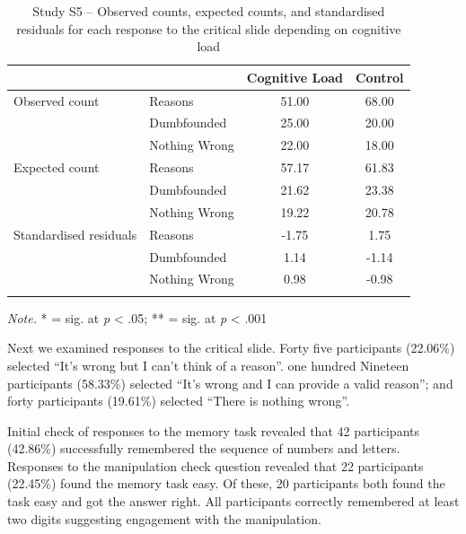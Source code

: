 \documentclass[
  american,
  man,floatsintext]{apa7}
\begin{document}
\begin{table}[tbp]

\begin{center}
\begin{threeparttable}

\caption{\label{tab:S5tab1dumb}Study S5 – Observed counts, expected counts, and standardised residuals for each response to the critical slide depending on cognitive load}

\begin{tabular}{llcc}
\toprule
 & \multicolumn{1}{c}{} & \multicolumn{1}{c}{Cognitive Load} & \multicolumn{1}{c}{Control}\\
\midrule
Observed count & Reasons & 51.00 & 68.00\\
 & Dumbfounded & 25.00 & 20.00\\
 & Nothing Wrong & 22.00 & 18.00\\
Expected count & Reasons & 57.17 & 61.83\\
 & Dumbfounded & 21.62 & 23.38\\
 & Nothing Wrong & 19.22 & 20.78\\
Standardised residuals & Reasons & -1.75 & 1.75\\
 & Dumbfounded & 1.14 & -1.14\\
 & Nothing Wrong & 0.98 & -0.98\\
\bottomrule
\addlinespace
\end{tabular}

\begin{tablenotes}[para]
\normalsize{\textit{Note.} * = sig. at \emph{p} < .05; ** = sig. at \emph{p} < .001}
\end{tablenotes}

\end{threeparttable}
\end{center}

\end{table}

Next we examined responses to the critical slide. Forty five participants (22.06\%) selected \enquote{It's wrong but I can't think of a reason}. one hundred Nineteen participants (58.33\%) selected \enquote{It's wrong and I can provide a valid reason}; and forty participants (19.61\%) selected \enquote{There is nothing wrong}.

Initial check of responses to the memory task revealed that 42 participants (42.86\%) successfully remembered the sequence of numbers and letters. Responses to the manipulation check question revealed that 22 participants (22.45\%) found the memory task easy. Of these, 20 participants both found the task easy and got the answer right. All participants correctly remembered at least two digits suggesting engagement with the manipulation.
\end{document}
